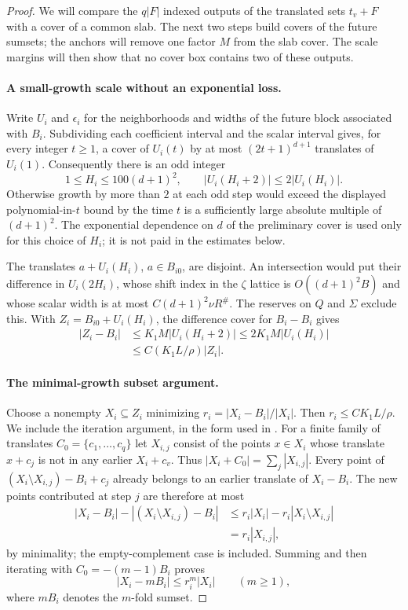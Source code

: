 \begin{proof}
We will compare the $q|F|$ indexed outputs of the translated sets
$t_v+F$ with a cover of a common slab.  The next two steps build
covers of the future sumsets; the anchors will remove one factor
$M$ from the slab cover.  The scale margins will then show that
no cover box contains two of these outputs.

\paragraph{A small-growth scale without an exponential loss.}
Write $U_i$ and $\epsilon_i$ for the neighborhoods and widths of the
future block associated with $B_i$.  Subdividing each coefficient
interval and the scalar interval gives, for every integer $t\geq1$,
a cover of $U_i(t)$ by at most $(2t+1)^{d+1}$ translates of $U_i(1)$.
Consequently there is an odd integer
\[
 1\leq H_i\leq100(d+1)^2,
 \qquad |U_i(H_i+2)|\leq2|U_i(H_i)|.
\]
Otherwise growth by more than $2$ at each odd step would exceed
the displayed polynomial-in-$t$ bound by the time $t$ is a
sufficiently large absolute multiple of $(d+1)^2$.  The exponential
dependence on $d$ of the preliminary cover is used only for this
choice of $H_i$; it is not paid in the estimates below.

The translates $a+U_i(H_i)$, $a\in B_{i0}$, are disjoint.  An
intersection would put their difference in $U_i(2H_i)$, whose
shift index in the $\zeta$ lattice is $O((d+1)^2B)$ and whose
scalar width is at most $C(d+1)^2\nu R^\#$.  The reserves on
$Q$ and $\Sigma$ exclude this.  With
$Z_i=B_{i0}+U_i(H_i)$, the difference cover for $B_i-B_i$ gives
\[
 \begin{split}
 |Z_i-B_i|
 &\leq K_1M|U_i(H_i+2)|
 \leq2K_1M|U_i(H_i)|\\
 &\leq C(K_1L/\rho)|Z_i|.
 \end{split}
\]

\paragraph{The minimal-growth subset argument.}
Choose a nonempty $X_i\subseteq Z_i$ minimizing
$r_i=|X_i-B_i|/|X_i|$.  Then $r_i\leq CK_1L/\rho$.
We include the iteration argument, in the form used in
\cite{Petridis2012}.  For a finite family of translates
$C_0=\{c_1,\ldots,c_q\}$ let $X_{i,j}$ consist of the points $x\in X_i$
whose translate $x+c_j$ is not in any earlier $X_i+c_v$.
Thus $|X_i+C_0|=\sum_j|X_{i,j}|$.  Every point of
$(X_i\setminus X_{i,j})-B_i+c_j$ already belongs to an earlier
translate of $X_i-B_i$.  The new points contributed at step $j$
are therefore at most
\[
 \begin{split}
 |X_i-B_i|-|(X_i\setminus X_{i,j})-B_i|
 &\leq r_i|X_i|-r_i|X_i\setminus X_{i,j}|\\
 &=r_i|X_{i,j}|,
 \end{split}
\]
by minimality; the empty-complement case is included.  Summing and
then iterating with $C_0=-(m-1)B_i$ proves
\[
 |X_i-mB_i|\leq r_i^m|X_i|\qquad(m\geq1),
\]
where $mB_i$ denotes the $m$-fold sumset.


\end{proof}
